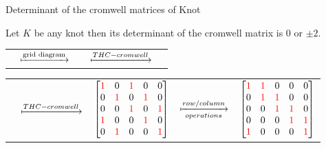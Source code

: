 \begin{frame}{Determinant of the cromwell matrices of Knot}
	\begin{thm}
		Let $K$ be any knot then its determinant of the cromwell matrix is $0$ or $\pm2$.
	\end{thm}
	\mypf
	\begin{tabu}{X[5c]X[2c]X[5c]X[c]X[2c]}
			 &
			$\xmapsto{\text{grid diagram}}$ &
			 &
			$\xmapsto{THC-cromwell}$ &
	\end{tabu}
	\begin{tabu}{X[c]X[1.5c]X[5c]X[c]X[5c]}
			 &
			$\xmapsto{THC-cromwell}$ &
			$\begin{bmatrix}
				\textcolor{red}{1} & 0 & \textcolor{red}{1} & 0 & 0\\
				0 & \textcolor{red}{1} & 0 & \textcolor{red}{1} & 0\\
				0 & 0 & \textcolor{red}{1} & 0 & \textcolor{red}{1}\\
				\textcolor{red}{1} & 0 & 0 & \textcolor{red}{1} & 0\\
				0 & \textcolor{red}{1} & 0 & 0 & \textcolor{red}{1}
			\end{bmatrix}$&
			$\xmapsto[operations]{row/column}$ &
			$\begin{bmatrix}
				\textcolor{red}{1} & \textcolor{red}{1} & 0 & 0 & 0\\
				0 & \textcolor{red}{1} & \textcolor{red}{1} & 0 & 0\\
				0 & 0 & \textcolor{red}{1} & \textcolor{red}{1} & 0\\
				0 & 0 & 0 & \textcolor{red}{1} & \textcolor{red}{1}\\
				\textcolor{red}{1} & 0 & 0 & 0 & \textcolor{red}{1}
			\end{bmatrix}$
	\end{tabu}
\end{frame}
